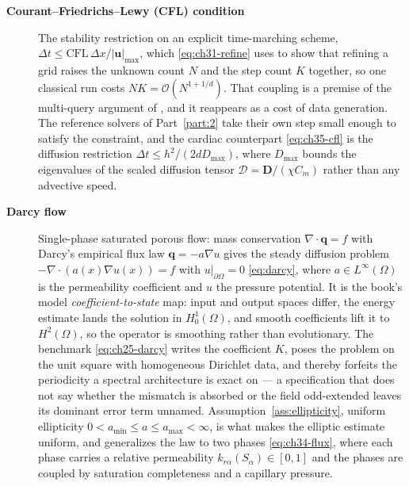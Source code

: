 \begin{description}
\item[\textbf{Courant--Friedrichs--Lewy (CFL) condition}] The stability restriction on
an explicit time-marching scheme, $\Delta t \le \mathrm{CFL}\,\Delta x /
|\mathbf{u}|_{\max}$, which \eqref{eq:ch31-refine} uses to show that refining a grid
raises the unknown count $N$ and the step count $K$ together, so one classical run
costs $NK = \mathcal{O}(N^{1+1/d})$. That coupling is a premise of the multi-query
argument of , and it
reappears as a cost of data generation. The reference solvers of
Part~\ref{part:2} take their own step small enough to satisfy the constraint, and the
cardiac counterpart \eqref{eq:ch35-cfl} is the diffusion restriction
$\Delta t \le h^{2}/(2 d D_{\max})$, where $D_{\max}$ bounds the eigenvalues of the scaled
diffusion tensor $\mathcal{D} = \mathbf{D}/(\chi C_{m})$ rather than any advective speed.

\item[\textbf{Darcy flow}] Single-phase saturated porous flow: mass conservation
$\nabla \cdot \mathbf{q} = f$ with Darcy's empirical flux law
$\mathbf{q} = -a\nabla u$ gives the steady diffusion problem
$-\nabla \cdot (a(x)\nabla u(x)) = f$ with $u|_{\partial\Omega} = 0$
\eqref{eq:darcy}, where $a \in L^{\infty}(\Omega)$ is the permeability coefficient
and $u$ the pressure potential. It is the book's model \emph{coefficient-to-state}
map: input and output spaces differ, the energy estimate lands the solution in
$H^{1}_{0}(\Omega)$, and smooth coefficients lift it to $H^{2}(\Omega)$, so the
operator is smoothing rather than evolutionary. The benchmark
\eqref{eq:ch25-darcy} writes the coefficient $K$, poses the problem on the unit
square with homogeneous Dirichlet data, and thereby forfeits the periodicity a
spectral architecture is exact on --- a specification that does not say whether the
mismatch is absorbed or the field odd-extended leaves its dominant error term
unnamed. Assumption~\ref{ass:ellipticity}, uniform ellipticity
$0 < a_{\min} \le a \le a_{\max} < \infty$, is what makes the elliptic estimate
uniform, and  generalizes
the law to two phases \eqref{eq:ch34-flux}, where each phase carries a relative
permeability $k_{r\alpha}(S_{\alpha}) \in [0,1]$ and the phases are coupled by
saturation completeness and a capillary pressure. 


\end{description}

